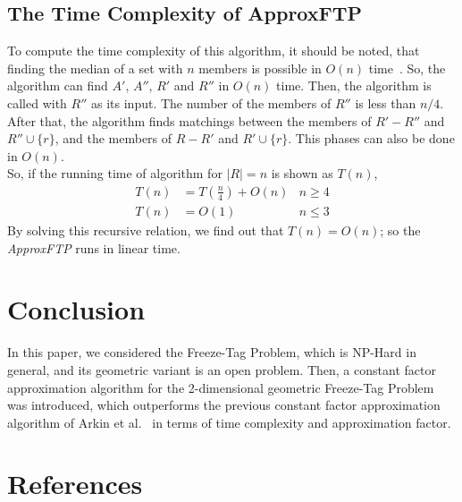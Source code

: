 \documentclass[review]{elsarticle}
\begin{document}
\subsection{The Time Complexity of ApproxFTP}
To compute the time complexity of this algorithm, it should be noted, that finding the median of a set with $n$ members is possible in $O(n)$ time~\cite{CLRS}. So, the algorithm can find $A'$, $A''$, $R'$ and $R''$ in $O(n)$ time. Then, the algorithm is called with $R''$ as its input. The number of the members of $R''$ is less than $n/4$. After that, the algorithm finds matchings between the members of ${ R'-R'' }$ and ${ R''\cup\{r\} }$, and the members of ${ R-R' }$ and ${ R'\cup\{r\} }$. This phases can also be done in $O(n)$.\\
So, if the running time of algorithm for ${ |R|=n }$ is shown as $T(n)$,
\begin{align}
T(n)&=T(\frac{n}{4})+O(n) &n\geq 4 \nonumber\\
T(n)&=O(1) &n\leq 3 \nonumber
\end{align}
By solving this recursive relation, we find out that ${ T(n)=O(n) }$; so the \textit{ApproxFTP}  runs in linear time.


\section{Conclusion}
In this paper, we considered the Freeze-Tag Problem, which is NP-Hard in general, and its geometric variant is an open problem. Then, a constant factor approximation algorithm for the 2-dimensional geometric Freeze-Tag Problem was introduced, which outperforms the previous constant factor approximation algorithm of Arkin et al.~\cite{Arkin2006} in terms of time complexity and approximation factor.


\section*{References}


\end{document}
